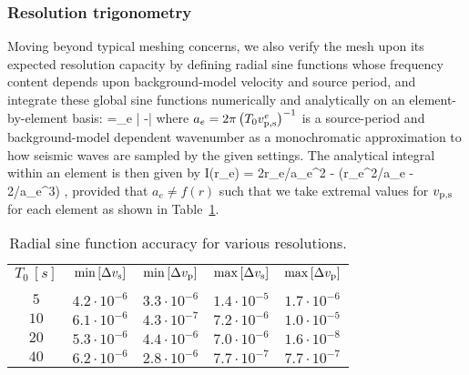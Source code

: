 \subsubsection{Resolution trigonometry}
%
Moving beyond typical meshing concerns, we also verify the mesh upon its 
expected resolution capacity by defining radial sine functions whose frequency 
content depends upon background-model velocity and source period, and integrate
these global sine functions numerically and analytically on an element-by-element 
basis:
%
\eq
{} =\sum_e \left| -\right| 
\en
%
where $a_e=2\pi \left(T_0 {v_{\rm p,s}^e}\right)^{-1}$ is a source-period and background-model 
dependent wavenumber as a monochromatic approximation to how seismic waves are 
sampled by the given settings. The analytical integral within an element is then given by
%
\eq
{\mathcal I}(r_e) = 2r_e/a_e^2  - (r_e^2/a_e - 2/a_e^3) ,
\en
%
provided that $a_e\neq f(r)$ such that we take extremal values for $v_{\rm p,s}$ for 
each element as shown in Table~\ref{table:resol_sine}.
%
\begin{table}[htb!]
\label{table:resol_sine}
\begin{center}
\caption{Radial sine function accuracy for various resolutions.}
\begin{tabular}{@{}ccccc}
&&&\\
\hline\hline
$T_0\, [s]$ & $\min{\left[\Delta v_{\rm s} \right]}$ &  $\min{\left[\Delta v_{\rm p} \right]}$ 
& $\max{\left[\Delta v_{\rm s} \right]}$ &  $\max{\left[\Delta v_{\rm p} \right]}$  \\
\hline\\
$5$ &  $4.2\cdot 10^{-6}$ & $3.3\cdot 10^{-6}$  & $1.4\cdot 10^{-5}$ & $1.7\cdot 10^{-6}$ \\[10pt]
$10$ & $6.1\cdot 10^{-6}$ & $4.3\cdot 10^{-7}$ & $7.2\cdot 10^{-6}$ & $1.0\cdot 10^{-5}$   \\[10pt]
$20$ & $5.3\cdot 10^{-6}$ & $4.4\cdot 10^{-6}$ & $7.0\cdot 10^{-6}$ & $1.6\cdot 10^{-8}$    \\[10pt]
$40$ & $6.2\cdot 10^{-6}$ & $2.8\cdot 10^{-6}$ & $7.7\cdot 10^{-7}$ & $7.7\cdot 10^{-7}$    \\[10pt]
%
\hline
\end{tabular}
\end{center}
\end{table}
%
%
